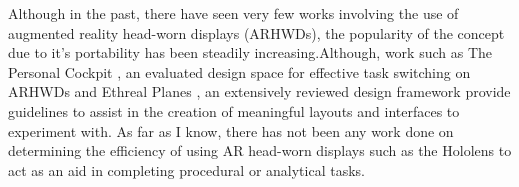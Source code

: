 Although in the past, there have seen very few works involving the use of augmented reality head-worn displays (ARHWDs), the popularity of the concept due to it's portability has been steadily increasing.Although, work such as The Personal Cockpit \cite{Ens2014}, an evaluated design space for effective task switching on ARHWDs and Ethreal Planes \cite{Ens2014a}, an extensively reviewed design framework provide guidelines to assist in the creation of meaningful layouts and interfaces to experiment with. As far as I know, there has not been any work done on determining the efficiency of using AR head-worn displays such as the Hololens to act as an aid in completing procedural or analytical tasks. 

